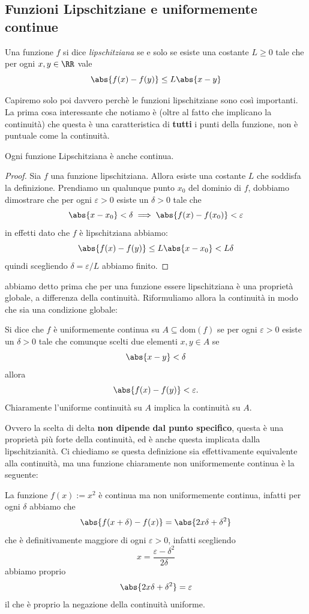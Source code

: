 \documentclass[11pt]{scrartcl}
\begin{document}
	\subsection{Funzioni Lipschitziane e uniformemente continue}
	\begin{definition}
		Una funzione $f$ si dice \textit{lipschitziana} se e solo se esiste una costante $L\ge 0$ tale che per ogni $x,y\in \RR$ vale
		$$\abs{f(x)-f(y)}\le L \abs{x-y}$$
	\end{definition}
	Capiremo solo poi davvero perchè le funzioni lipschitziane sono così importanti. La prima cosa interessante che notiamo è (oltre al fatto che implicano la continuità) che questa è una caratteristica di \textbf{tutti} i punti della funzione, non è puntuale come la continuità.
	\begin{lemma}
		Ogni funzione Lipschitziana è anche continua.
	\end{lemma}
	\begin{proof}
		Sia $f$ una funzione lipschitziana. Allora esiste una costante $L$ che soddisfa la definizione. Prendiamo un qualunque punto $x_0$ del dominio di $f$, dobbiamo dimostrare che per ogni $\varepsilon>0$ esiste un $\delta>0$ tale che 
		$$\abs{x-x_0}<\delta \implies \abs{f(x)-f(x_0)}<\varepsilon$$
		in effetti dato che $f$ è lipschitziana abbiamo: 
		$$\abs{f(x)-f(y)}\le L\abs{x-x_0}<L\delta$$
		quindi scegliendo $\delta=\varepsilon/L$ abbiamo finito.
	\end{proof}
	abbiamo detto prima che per una funzione essere lipschitziana è una proprietà globale, a differenza della continuità. Riformuliamo allora la continuità in modo che sia una condizione globale:
	\begin{definition}
		Si dice che $f$ è uniformemente continua su $A\subseteq \text{dom}(f)$ se per ogni $\varepsilon>0$ esiste un $\delta>0$ tale che comunque scelti due elementi $x,y\in A$ se 
		$$\abs{x-y}<\delta$$
		allora 
		$$\abs{f(x)-f(y)}<\varepsilon.$$
		Chiaramente l'uniforme continuità su $A$ implica la continuità su $A$.
	\end{definition}
	Ovvero la scelta di delta \textbf{non dipende dal punto specifico}, questa è una proprietà più forte della continuità, ed è anche questa implicata dalla lipschitzianità. Ci chiediamo se questa definizione sia effettivamente equivalente alla continuità, ma una funzione chiaramente non uniformemente continua è la seguente:
	\begin{example}
		La funzione $f(x):=x^2$ è continua ma non uniformemente continua, infatti per ogni $\delta$ abbiamo che
		$$\abs{f(x+\delta)-f(x)}=\abs{2x\delta +\delta^2}$$
		che è definitivamente maggiore di ogni $\varepsilon>0$, infatti scegliendo 
		$$x=\frac{\varepsilon-\delta^2}{2\delta}$$
		abbiamo proprio
		$$\abs{2x\delta +\delta^2}=\varepsilon$$
		il che è proprio la negazione della continuità uniforme.
	\end{example}
\end{document}

